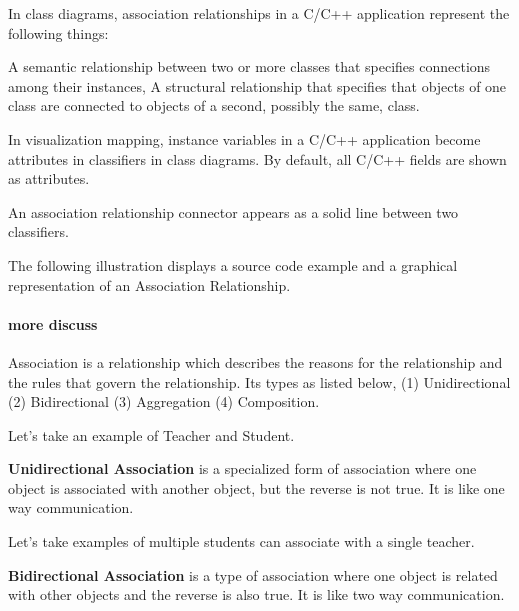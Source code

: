 \documentclass{book}
\begin{document}
In class diagrams, association relationships in a C/C++ application represent the following things:

    A semantic relationship between two or more classes that specifies connections among their instances,
        A structural relationship that specifies that objects of one class are connected to objects of a second, possibly the same, class.

        In visualization mapping, instance variables in a C/C++ application become attributes in classifiers in class diagrams. By default, all C/C++ fields are shown as attributes.

        An association relationship connector appears as a solid line between two classifiers.

        The following illustration displays a source code example and a graphical representation of an Association Relationship.
\begin{figure}[h]
\begin{floatrow}
\end{floatrow}
\end{figure}
\paragraph{more discuss}
Association is a relationship which describes the reasons for the relationship and the rules that govern the relationship. Its types as listed below,
  (1)  Unidirectional (2)  Bidirectional (3) Aggregation (4) Composition.
\begin{figure}[h]
\begin{floatrow}
\end{floatrow}
\end{figure}

Let’s take an example of Teacher and Student.

\textbf{Unidirectional Association} is a specialized form of association where one object is associated with another object, but the reverse is not true. It is like one way communication.

Let’s take examples of multiple students can associate with a single teacher. 

\textbf{Bidirectional Association} is a type of association where one object is related with other objects and the reverse is also true. It is like two way communication.
\end{document}
